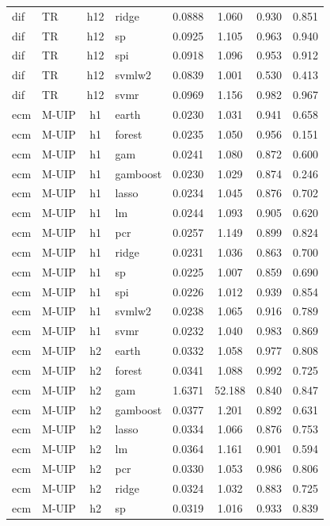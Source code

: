 \begin{ThreePartTable}
\begin{longtable}[t]{llclcccc}
dif & TR & h12 & ridge & 0.0888 & 1.060 & 0.930 & 0.851\\
dif & TR & h12 & sp & 0.0925 & 1.105 & 0.963 & 0.940\\
dif & TR & h12 & spi & 0.0918 & 1.096 & 0.953 & 0.912\\
dif & TR & h12 & svmlw2 & 0.0839 & 1.001 & 0.530 & 0.413\\
dif & TR & h12 & svmr & 0.0969 & 1.156 & 0.982 & 0.967\\
\addlinespace
ecm & M-UIP & h1 & earth & 0.0230 & 1.031 & 0.941 & 0.658\\
ecm & M-UIP & h1 & forest & 0.0235 & 1.050 & 0.956 & 0.151\\
ecm & M-UIP & h1 & gam & 0.0241 & 1.080 & 0.872 & 0.600\\
ecm & M-UIP & h1 & gamboost & 0.0230 & 1.029 & 0.874 & 0.246\\
ecm & M-UIP & h1 & lasso & 0.0234 & 1.045 & 0.876 & 0.702\\
ecm & M-UIP & h1 & lm & 0.0244 & 1.093 & 0.905 & 0.620\\
ecm & M-UIP & h1 & pcr & 0.0257 & 1.149 & 0.899 & 0.824\\
ecm & M-UIP & h1 & ridge & 0.0231 & 1.036 & 0.863 & 0.700\\
ecm & M-UIP & h1 & sp & 0.0225 & 1.007 & 0.859 & 0.690\\
ecm & M-UIP & h1 & spi & 0.0226 & 1.012 & 0.939 & 0.854\\
ecm & M-UIP & h1 & svmlw2 & 0.0238 & 1.065 & 0.916 & 0.789\\
ecm & M-UIP & h1 & svmr & 0.0232 & 1.040 & 0.983 & 0.869\\
\addlinespace
ecm & M-UIP & h2 & earth & 0.0332 & 1.058 & 0.977 & 0.808\\
ecm & M-UIP & h2 & forest & 0.0341 & 1.088 & 0.992 & 0.725\\
ecm & M-UIP & h2 & gam & 1.6371 & 52.188 & 0.840 & 0.847\\
ecm & M-UIP & h2 & gamboost & 0.0377 & 1.201 & 0.892 & 0.631\\
ecm & M-UIP & h2 & lasso & 0.0334 & 1.066 & 0.876 & 0.753\\
ecm & M-UIP & h2 & lm & 0.0364 & 1.161 & 0.901 & 0.594\\
ecm & M-UIP & h2 & pcr & 0.0330 & 1.053 & 0.986 & 0.806\\
ecm & M-UIP & h2 & ridge & 0.0324 & 1.032 & 0.883 & 0.725\\
ecm & M-UIP & h2 & sp & 0.0319 & 1.016 & 0.933 & 0.839\\

\end{longtable}
\end{ThreePartTable}

